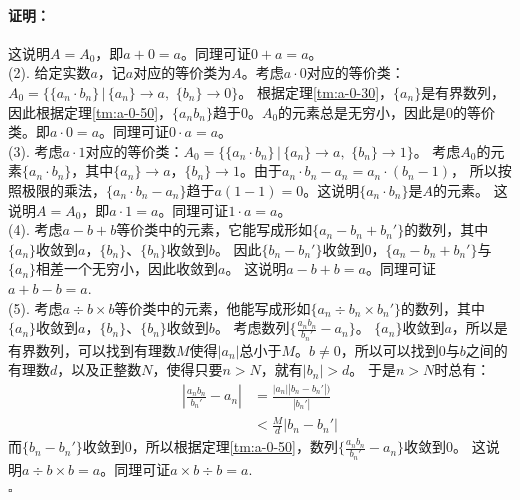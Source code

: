 \documentclass[12pt,UTF8]{ctexbook}
\renewenvironment{proof}{\paragraph{\textbf{证明：}}}{\hfill$\square$}
\begin{document}
\begin{appendix}
\begin{proof}
    这说明$A = A_0$，即$a + 0 = a$。同理可证$0+a=a$。\\
    (2). 给定实数$a$，记$a$对应的等价类为$A$。考虑$a\cdot 0$对应的等价类：$A_0 = \{ \{a_n \cdot b_n\} \,|\, \{a_n\}\to a, \,\, \{b_n\} \to 0 \}$。
    根据定理\ref{tm:a-0-30}，$\{a_n\}$是有界数列，因此根据定理\ref{tm:a-0-50}，$\{a_nb_n\}$趋于$0$。$A_0$的元素总是无穷小，因此是$0$的等价类。即$a \cdot 0 = a$。同理可证$0\cdot a=a$。\\
    (3). 考虑$a\cdot 1$对应的等价类：$A_0 = \{\{a_n \cdot b_n\} \,|\, \{a_n\}\to a, \,\, \{b_n\} \to 1 \}$。
    考虑$A_0$的元素$\{a_n \cdot b_n\}$，其中$\{a_n\}\to a$，$\{b_n\} \to 1$。由于$a_n \cdot b_n - a_n = a_n \cdot (b_n - 1)$，
    所以按照极限的乘法，$\{a_n \cdot b_n - a_n\}$趋于$a(1 - 1) = 0$。这说明$\{a_n \cdot b_n\}$是$A$的元素。
    这说明$A = A_0$，即$a \cdot 1 = a$。同理可证$1 \cdot a = a$。\\
    (4). 考虑$a - b + b$等价类中的元素，它能写成形如$\{a_n - b_n + b_n'\}$的数列，其中$\{a_n\}$收敛到$a$，$\{b_n\}$、$\{b_n\}$收敛到$b$。
    因此$\{b_n - b_n'\}$收敛到$0$，$\{a_n - b_n + b_n'\}$与$\{a_n\}$相差一个无穷小，因此收敛到$a$。
    这说明$a - b + b = a$。同理可证$a + b - b = a.$\\
    (5). 考虑$a \div b \times b$等价类中的元素，他能写成形如$\{a_n \div b_n \times b_n'\}$的数列，其中$\{a_n\}$收敛到$a$，$\{b_n\}$、$\{b_n\}$收敛到$b$。
    考虑数列$\{\frac{a_n b_n}{b_n'} - a_n\}$。
    $\{a_n\}$收敛到$a$，所以是有界数列，可以找到有理数$M$使得$|a_n|$总小于$M$。$b\neq 0$，所以可以找到$0$与$b$之间的有理数$d$，以及正整数$N$，使得只要$n>N$，就有$|b_n| > d$。
    于是$n>N$时总有：
    \begin{align*}
        \left|\frac{a_n b_n}{b_n'} - a_n\right| &= \frac{\left|a_n\right| \left|b_n - b_n'\right|)}{\left|b_n'\right|}  \\
        &< \frac{M}{d}\left|b_n - b_n'\right| 
    \end{align*}
    而$\{b_n - b_n'\}$收敛到$0$，所以根据定理\ref{tm:a-0-50}，数列$\{\frac{a_n b_n}{b_n'} - a_n\}$收敛到$0$。
    这说明$a \div b \times b = a$。同理可证$a\times b \div b = a.$\\
\end{proof}


\end{appendix}
\end{document}
